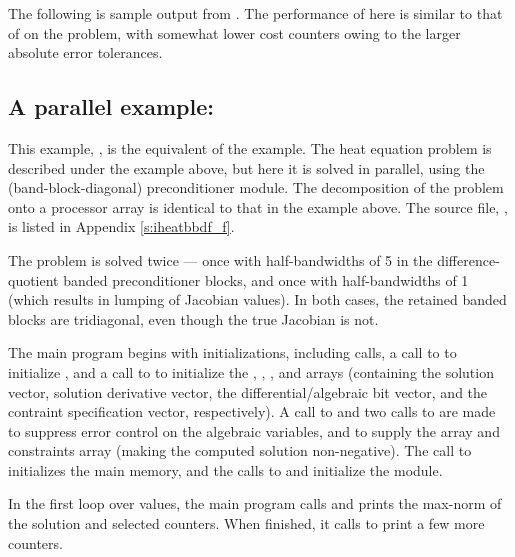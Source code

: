 The following is sample output from .
The performance of {\fida} here is similar to that of {\ida} on
the  problem, with somewhat lower cost counters owing to
the larger absolute error tolerances.



\subsection{A parallel example: }\label{ss:iheatbbdf}

This example, , is the {\F} equivalent of the 
example.  The heat equation problem is described under the 
example above, but here it is solved in parallel, using the {\idabbdpre}
(band-block-diagonal) preconditioner module.  The decomposition of the
problem onto a processor array is identical to that in the 
example above.  The source file, , is listed in
Appendix \ref{s:iheatbbdf_f}.

The problem is solved twice --- once with half-bandwidths of 5 in the
difference-quotient banded preconditioner blocks, and once with
half-bandwidths of 1 (which results in lumping of Jacobian values).
In both cases, the retained banded blocks are tridiagonal, even though
the true Jacobian is not.

The main program begins with initializations, including {\mpi} calls,
a call to  to initialize {\nvecp}, and a call to
 to initialize the , , , and
 arrays (containing the solution vector, solution derivative vector,
the differential/algebraic bit vector, and the contraint specification
vector, respectively).  A call to  and two calls to
 are made to suppress error control on the algebraic
variables, and to supply the  array and constraints array (making
the computed solution non-negative).  The call to 
initializes the {\fida} main memory, and the calls to 
and  initialize the {\fidabbd} module.

In the first loop over  values, the main program calls 
and prints the max-norm of the solution and selected counters.  When finished,
it calls  to print a few more counters.

